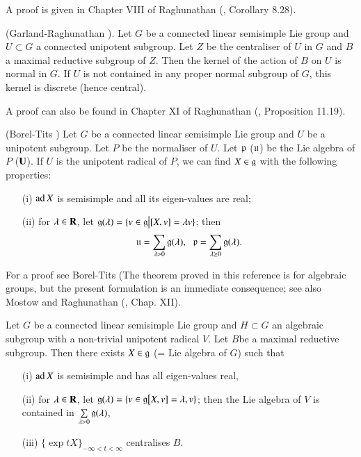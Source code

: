 A proof is given in Chapter VIII of Raghunathan (\cite{art9-raghunathan-1}, Corollary 8.28).

\begin{romantheorem}{\rm (Garland-Raghunathan \cite{art9-garland-raghunathan-1}).}\label{art9-romanthm4}
Let $G$ be a connected linear semisimple Lie group and $U \subset G$ a connected unipotent subgroup. Let $Z$ be the centraliser of $U$ in $G$ and $B$ a maximal reductive subgroup of $Z$. Then the kernel of the action of $B$ on $U$ is normal in $G$. If $U$ is not contained in any proper normal subgroup of $G$, this kernel is discrete (hence central).
\end{romantheorem}

A proof can also be found in Chapter XI of Raghunathan (\cite{art9-raghunathan-1}, Proposition 11.19).

\begin{romantheorem}{\rm (Borel-Tits \cite{art9-borel-tits-2})}\label{art9-romanthm5}
Let $G$ be a connected linear semisimple Lie group and $U$ be a unipotent subgroup. Let $P$ be the normaliser of $U$. Let $\mathfrak{p}$ (\resp $\mathfrak{u}$) be the Lie algebra of $P$ (\resp $\mathbf{U}$). If $U$ is the unipotent radical of $P$, we can find $X \in \mathfrak{g}$ with the following properties:
\begin{itemize}
\item[(i)] $\operatorname{ad} X$ is semisimple and all its eigen-values are real;

\item[(ii)] for $\lambda \in \mathbf{R}$, let $\mathfrak{g}(\lambda) = \{v \in \mathfrak{g}  \big| [X, v] = \lambda v\}$; then
$$
\mathfrak{u} = \sum\limits_{\lambda > 0} \mathfrak{g} (\lambda), \;\; \mathfrak{p} = \sum\limits_{\lambda \geq 0 } \mathfrak{g} (\lambda).
$$
\end{itemize}
 \end{romantheorem}

For a proof see Borel-Tits \cite{art9-borel-tits-1} (The theorem proved in this reference is for algebraic groups, but the present formulation is an immediate consequence; see also Mostow \cite{art9-mostow-1} and Raghunathan (\cite{art9-raghunathan-1}, Chap. XII).


\begin{romancorollary}\label{art9-romancoro6}
Let $G$ be a connected linear semisimple Lie group and $H \subset G$ an algebraic subgroup with a non-trivial unipotent radical $V$.
Let $B$\pageoriginale be a maximal reductive subgroup. Then there exists $X \in \mathfrak{g}$ (= Lie algebra of $G$) such that
\begin{itemize}
\item[(i)] $\operatorname{ad} X$ is semisimple and has all eigen-values real,

\item[(ii)] for $\lambda \in \mathbf{R}$, let $\mathfrak{g} (\lambda) = \{v \in \mathfrak{g} \big [X, v] = \lambda, v\}$; then the Lie algebra of $V$ is contained in $\sum\limits_{\lambda > 0} \mathfrak{g} (\lambda)$, 

\item[(iii)] $\{\exp t X\}_{- \infty < t < \infty}$ centralises $B$.
\end{itemize}
\end{romancorollary}

